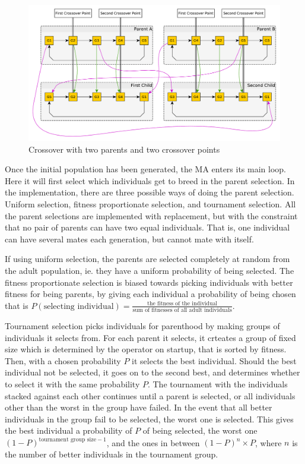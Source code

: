 \begin{figure}[thbp]
	\centerline{\includegraphics[width=\textwidth]{figures/Architecture/Crossover_Illustration.pdf}}
	\caption{Crossover with two parents and two crossover points}
	\label{fig:crossover_illustration}
\end{figure}

Once the initial population has been generated, the MA enters its main loop. Here it will first select which individuals get to breed in the parent selection. In the implementation, there are three possible ways of doing the parent selection. Uniform selection, fitness proportionate selection, and tournament selection. All the parent selections are implemented with replacement, but with the constraint that no pair of parents can have two equal individuals. That is, one individual can have several mates each generation, but cannot mate with itself.

If using uniform selection, the parents are selected completely at random from the adult population, ie. they have a uniform probability of being selected. The fitness proportionate selection is biased towards picking individuals with better fitness for being parents, by giving each individual a probability of being chosen that is $P(\text{selecting individual}) = \frac{\text{the fitness of the individual}}{\text{sum of fitnesses of all adult individuals}}$.

Tournament selection picks individuals for parenthood by making groups of individuals it selects from. For each parent it selects, it crteates a group of fixed size which is determined by the operator on startup, that is sorted by fitness. Then, with a chosen probability $P$ it selects the best individual. Should the best individual not be selected, it goes on to the second best, and determines whether to select it with the same probability $P$. The tournament with the individuals stacked against each other continues until a parent is selected, or all individuals other than the worst in the group have failed. In the event that all better individuals in the group fail to be selected, the worst one is selected. This gives the best individual a probability of $P$ of being selected, the worst one $(1-P)^{\text{tournament group size}-1}$, and the ones in between $(1-P)^{n} \times P$, where $n$ is the number of better individuals in the tournament group.

